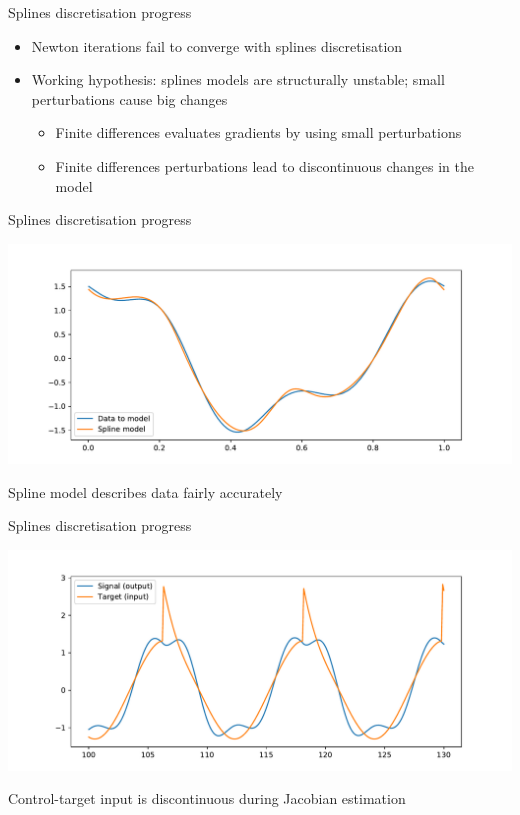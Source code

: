 \documentclass[presentation]{beamer}
\begin{document}
\begin{frame}[label={sec:org2c450ec}]{Splines discretisation progress}
\begin{itemize}
\item Newton iterations fail to converge with splines discretisation
\end{itemize}
\vfill
\begin{itemize}
\item Working hypothesis: splines models are structurally unstable; small perturbations cause big changes
\begin{itemize}
\item Finite differences evaluates gradients by using small perturbations
\item Finite differences perturbations lead to discontinuous changes in the model
\end{itemize}
\end{itemize}
\end{frame}


\begin{frame}[label={sec:org81c153f}]{Splines discretisation progress}
\begin{center}
\includegraphics[width=.9\linewidth]{./modelling.pdf}
\end{center}

Spline model describes data fairly accurately
\end{frame}

\begin{frame}[label={sec:org8c27617}]{Splines discretisation progress}
\begin{center}
\includegraphics[width=.9\linewidth]{./perturbation.pdf}
\end{center}

Control-target input is discontinuous during Jacobian estimation
\end{frame}
\end{document}
